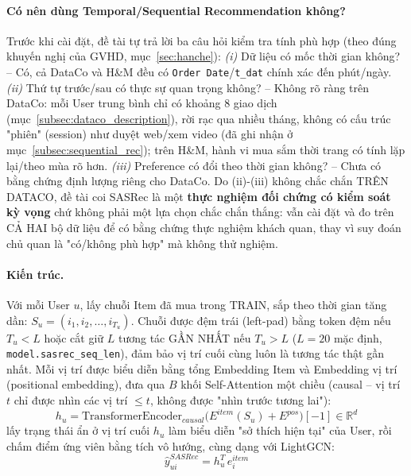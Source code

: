 \paragraph{Có nên dùng Temporal/Sequential Recommendation không?} Trước khi cài đặt, đề tài tự trả lời ba câu hỏi kiểm tra tính phù hợp (theo đúng khuyến nghị của GVHD, mục~\ref{sec:hanche}): \textit{(i)} Dữ liệu có mốc thời gian không? -- Có, cả DataCo và H\&M đều có \texttt{Order Date}/\texttt{t\_dat} chính xác đến phút/ngày. \textit{(ii)} Thứ tự trước/sau có thực sự quan trọng không? -- Không rõ ràng trên DataCo: mỗi User trung bình chỉ có khoảng 8 giao dịch (mục~\ref{subsec:dataco_description}), rời rạc qua nhiều tháng, không có cấu trúc "phiên" (session) như duyệt web/xem video (đã ghi nhận ở mục~\ref{subsec:sequential_rec}); trên H\&M, hành vi mua sắm thời trang có tính lặp lại/theo mùa rõ hơn. \textit{(iii)} Preference có đổi theo thời gian không? -- Chưa có bằng chứng định lượng riêng cho DataCo. Do (ii)-(iii) không chắc chắn TRÊN DATACO, đề tài coi SASRec là một \textbf{thực nghiệm đối chứng có kiểm soát kỳ vọng} chứ không phải một lựa chọn chắc chắn thắng: vẫn cài đặt và đo trên CẢ HAI bộ dữ liệu để có bằng chứng thực nghiệm khách quan, thay vì suy đoán chủ quan là "có/không phù hợp" mà không thử nghiệm.

\paragraph{Kiến trúc.} Với mỗi User $u$, lấy chuỗi Item đã mua trong TRAIN, sắp theo thời gian tăng dần: $S_u = (i_1, i_2, \dots, i_{T_u})$. Chuỗi được đệm trái (left-pad) bằng token đệm nếu $T_u < L$ hoặc cắt giữ $L$ tương tác GẦN NHẤT nếu $T_u > L$ ($L=20$ mặc định, \texttt{model.sasrec\_seq\_len}), đảm bảo vị trí cuối cùng luôn là tương tác thật gần nhất. Mỗi vị trí được biểu diễn bằng tổng Embedding Item và Embedding vị trí (positional embedding), đưa qua $B$ khối Self-Attention một chiều (causal -- vị trí $t$ chỉ được nhìn các vị trí $\leq t$, không được "nhìn trước tương lai"):
\begin{equation}
    h_u = \text{TransformerEncoder}_{causal}\big(E^{item}(S_u) + E^{pos}\big)[-1] \in \mathbb{R}^d
    \label{eq:sasrec_encode}
\end{equation}
lấy trạng thái ẩn ở vị trí cuối $h_u$ làm biểu diễn "sở thích hiện tại" của User, rồi chấm điểm ứng viên bằng tích vô hướng, cùng dạng với LightGCN:
\begin{equation}
    \hat{y}_{ui}^{SASRec} = h_u^T \, e_i^{item}
    \label{eq:sasrec_predict}
\end{equation}

